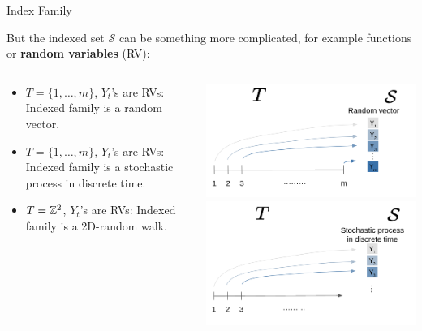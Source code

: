 \begin{frame}[c,allowframebreaks]{Index Family}

\framebreak


But the indexed set $\mathcal{S}$ can be something more complicated, for example functions or \textbf{random variables} (RV):

\begin{columns}[T]
\begin{column}{.5\textwidth}
\vspace*{1cm}
  \begin{itemize}
    \item $T = \{1,\dots, m\}$, $Y_t$'s are RVs: Indexed family is a random vector.
    \vspace*{0.4cm}
    \item $T = \{1,\dots, m\}$, $Y_t$'s are RVs: Indexed family is a stochastic process in discrete time. 
    \vspace*{0.4cm}
    \item $T = \mathbb{Z}^2$, $Y_t$'s are RVs: Indexed family is a 2D-random walk.
  \end{itemize}
  
\end{column}
\begin{column}{.35\textwidth}
\includegraphics[width=\textwidth]{figure_man/indexed_family/indexed_family_4.png}\\
\includegraphics[width=\textwidth]{figure_man/indexed_family/indexed_family_3.png}
\end{column}
\end{columns}




\end{frame}

